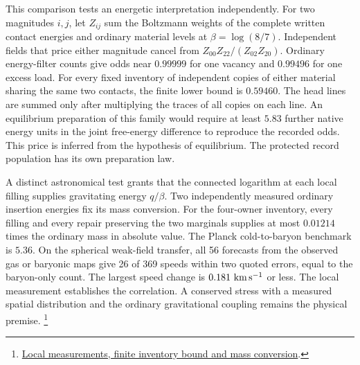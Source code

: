 \documentclass[11pt]{article}
\begin{document}
This comparison tests an energetic interpretation independently.
For two magnitudes \(i,j\), let \(Z_{ij}\) sum the Boltzmann weights of
the complete written contact energies and ordinary material levels at
\(\beta=\log(8/7)\). Independent fields that price either magnitude
cancel from \(Z_{00}Z_{22}/(Z_{02}Z_{20})\). Ordinary energy-filter
counts give odds near \(0.99999\) for one vacancy and \(0.99496\) for
one excess load. For every fixed inventory of independent copies of
either material sharing the same two contacts, the finite lower bound
is \(0.59460\). The head lines are summed only after multiplying the
traces of all copies on each line. An equilibrium preparation of this
family would require at least \(5.83\) further native energy units
in the joint free-energy difference to reproduce the recorded odds.
This price is inferred from the hypothesis of equilibrium. The protected
record population has its own preparation law.

A distinct astronomical test grants that the connected logarithm at each
local filling supplies gravitating energy \(q/\beta\). Two independently
measured ordinary insertion energies fix its mass conversion. For the
four-owner inventory, every filling and every repair preserving the two
marginals supplies at most \(0.01214\) times the ordinary mass in absolute
value. The Planck cold-to-baryon benchmark is \(5.36\). On the spherical
weak-field transfer, all 56 forecasts from the observed gas or baryonic
maps give 26 of 369 speeds within two quoted errors, equal to the
baryon-only count. The largest speed change is \(0.181\ {\rm km\,s^{-1}}\)
or less. The local measurement establishes the correlation.
A conserved stress with a measured spatial distribution and the ordinary
gravitational coupling remains the physical premise.%
\footnote{\href{https://github.com/FloatingPragma/observer-patch-holography/blob/main/model/experiments/interval_echo_shell_flux/product_address/green_response/material_recoil/overlap_source/native_boundary/stock/aperture/EQUILIBRIUM_RESULTS.md}{Local measurements, finite inventory bound and mass conversion}.}
\end{document}
